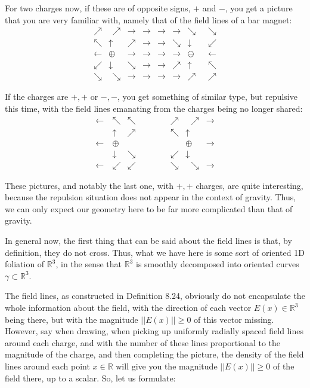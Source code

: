 \documentclass[12pt]{amsbook}
\begin{document}
For two charges now, if these are of opposite signs, $+$ and $-$, you get a picture that you are very familiar with, namely that of the field lines of a bar magnet:
$$\begin{matrix}
\nearrow&\ \ \nearrow&\rightarrow&\rightarrow&\rightarrow&\rightarrow&\searrow\ \ \ &\!\!\!\searrow\\
\nwarrow&\!\!\!\uparrow&\nearrow&\rightarrow&\rightarrow&\searrow&\downarrow&\!\!\!\swarrow\\
\leftarrow&\!\!\!\oplus&\rightarrow&\rightarrow&\rightarrow&\rightarrow&\ominus&\!\!\!\leftarrow\\
\swarrow&\!\!\!\downarrow&\searrow&\rightarrow&\rightarrow&\nearrow&\uparrow&\!\!\!\nwarrow\\
\searrow&\ \ \searrow&\rightarrow&\rightarrow&\rightarrow&\rightarrow&\nearrow\ \ \ &\!\!\!\nearrow
\end{matrix}$$

If the charges are $+,+$ or $-,-$, you get something of similar type, but repulsive this time, with the field lines emanating from the charges being no longer shared:
$$\begin{matrix}
\leftarrow\ &\!\!\!\!\!\nwarrow&\nwarrow&&&\nearrow&\ \ \ \nearrow&\rightarrow\\
&\uparrow&\nearrow&&&\nwarrow&\uparrow&\\
\leftarrow&\oplus&\ &\ &\ \ \ \ \ \ \ &\ &\oplus&\rightarrow\\
&\downarrow&\searrow&&&\swarrow&\downarrow&\\
\leftarrow\ &\!\!\!\!\!\swarrow&\swarrow&&&\searrow&\ \ \ \searrow&\rightarrow
\end{matrix}$$

These pictures, and notably the last one, with $+,+$ charges, are quite interesting, because the repulsion situation does not appear in the context of gravity. Thus, we can only expect our geometry here to be far more complicated than that of gravity.

\bigskip

In general now, the first thing that can be said about the field lines is that, by definition, they do not cross. Thus, what we have here is some sort of oriented 1D foliation of $\mathbb R^3$, in the sense that $\mathbb  R^3$ is smoothly decomposed into oriented curves $\gamma\subset\mathbb R^3$.

\bigskip

The field lines, as constructed in Definition 8.24, obviously do not encapsulate the whole information about the field, with the direction of each vector $E(x)\in\mathbb R^3$ being there, but with the magnitude $||E(x)||\geq0$ of this vector missing. However, say when drawing, when picking up uniformly radially spaced field lines around each charge, and with the number of these lines proportional to the magnitude of the charge, and then completing the picture, the density of the field lines around each point $x\in\mathbb R$ will give you the magnitude $||E(x)||\geq0$ of the field there, up to a scalar. So, let us formulate:
\end{document}
